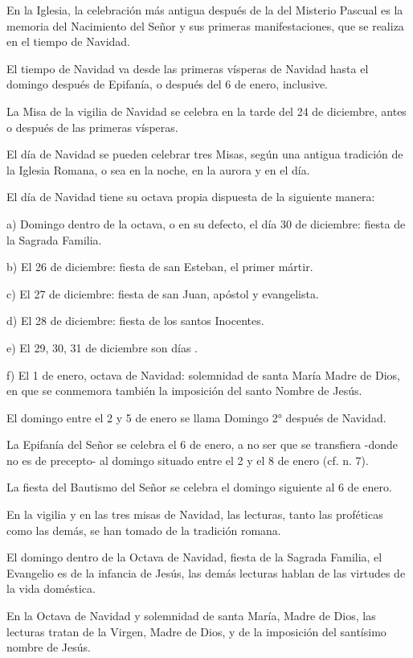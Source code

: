 \begin{body}
\begin{body}
En la Iglesia, la celebración más antigua después de la del Misterio Pascual es la memoria del Nacimiento del Señor y sus primeras manifestaciones, que se realiza en el tiempo de Navidad.

El tiempo de Navidad va desde las primeras vísperas de Navidad hasta el domingo después de Epifanía, o después del 6 de enero, inclusive.

La Misa de la vigilia de Navidad se celebra en la tarde del 24 de diciembre, antes o después de las primeras vísperas.

El día de Navidad se pueden celebrar tres Misas, según una antigua tradición de la Iglesia Romana, o sea en la noche, en la aurora y en el día.

El día de Navidad tiene su octava propia dispuesta de la siguiente manera:

a) Domingo dentro de la octava, o en su defecto, el día 30 de diciembre: fiesta de la Sagrada Familia.

b) El 26 de diciembre: fiesta de san Esteban, el primer mártir.

c) El 27 de diciembre: fiesta de san Juan, apóstol y evangelista.

d) El 28 de diciembre: fiesta de los santos Inocentes.

e) El 29, 30, 31 de diciembre son días .

f) El 1 de enero, octava de Navidad: solemnidad de santa María Madre de Dios, en que se conmemora también la imposición del santo Nombre de Jesús.

El domingo entre el 2 y 5 de enero se llama Domingo 2° después de Navidad.

La Epifanía del Señor se celebra el 6 de enero, a no ser que se transfiera -donde no es de precepto- al domingo situado entre el 2 y el 8 de enero (cf. n. 7).

La fiesta del Bautismo del Señor se celebra el domingo siguiente al 6 de enero.

En la vigilia y en las tres misas de Navidad, las lecturas, tanto las proféticas como las demás, se han tomado de la tradición romana.

El domingo dentro de la Octava de Navidad, fiesta de la Sagrada Familia, el Evangelio es de la infancia de Jesús, las demás lecturas hablan de las virtudes de la vida doméstica.

En la Octava de Navidad y solemnidad de santa María, Madre de Dios, las lecturas tratan de la Virgen, Madre de Dios, y de la imposición del santísimo nombre de Jesús.


\end{body}
\end{body}

